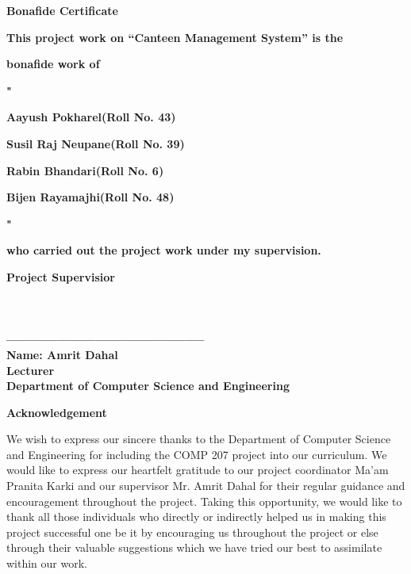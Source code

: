 \documentclass[12pt]{article}
\begin{document}
\clearpage
\thispagestyle{empty}
\vspace*{10mm}
\centerline{\textbf{\LARGE{Bonafide Certificate}}}
\vspace*{30mm}
\centerline{\textbf{\Large{This project work on “Canteen Management System” is the}}} 
\vspace*{2mm}
\centerline{\textbf{\Large{bonafide work of}}}
\vspace*{2mm}
\centerline{\textbf{\Large{"}}}
\centerline{\textbf{\Large{Aayush Pokharel(Roll No. 43)}}}
\centerline{\textbf{\Large{Susil Raj Neupane(Roll No. 39)}}}
\centerline{\textbf{\Large{Rabin Bhandari(Roll No. 6)}}}
\centerline{\textbf{\Large{Bijen Rayamajhi(Roll No. 48)}}}
\centerline{\textbf{\Large{"}}}
\vspace*{2mm}
\centerline{\textbf{\Large{who carried out the project work under my supervision.}}}
\vspace*{30mm}
\textbf{\Large{Project Supervisior}}
\\\\
\\\\
\textbf{-----------------------------------------------}
\vspace*{2mm}
\\
{\textbf{\Large{Name: Amrit Dahal}}}
\vspace*{2mm}\\
{\textbf{\Large{Lecturer}}}
\vspace*{2mm}\\
{\textbf{\Large{Department of Computer Science and Engineering}}}

\clearpage
\thispagestyle{empty}

\textbf{\Large{Acknowledgement}}
\vspace*{5mm}

We wish to express our sincere thanks to the Department of Computer Science and Engineering for including the COMP 207 project into our curriculum. We would like to express 
our heartfelt gratitude to our project coordinator Ma'am Pranita Karki and our supervisor Mr. Amrit Dahal for their regular guidance and encouragement throughout the project. 
Taking this opportunity, we would like to thank all those individuals who directly or indirectly helped us in making this project successful one be it by encouraging us 
throughout the project or else through their valuable suggestions which we have tried our best to assimilate within our work.


\clearpage
\thispagestyle{empty}
\end{document}

